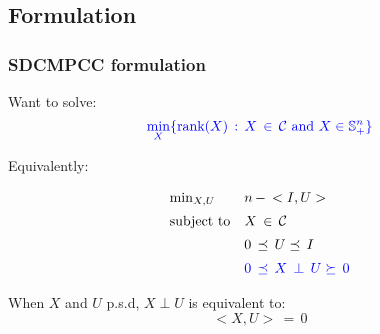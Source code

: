 \documentclass{beamer}
\newcommand{\tblue}{\textcolor{blue}}
\newcommand{\tmag}{\textcolor{magenta}}
\newcommand{\re}{I\!\!\!R}
\begin{document}
%
%
%
%
%
%
%
%
%
%


\subsection*{Formulation}


\begin{frame}
\frametitle{SDCMPCC formulation}

Want to solve:
\begin{displaymath}
\tblue{\min_X \{\mbox{rank} (X) \, : \, X\,\in\,\mathcal{C} ~\mbox{and}~ X \in \mathbb{S}^{n}_+\}}
\end{displaymath}

\bigskip

Equivalently:

\begin{displaymath}
\begin{array}{lll}
\min_{X,U} & n\,-\,<I, U> \\  [5pt]
\mbox{subject to} & X\,\in\,\mathcal{C} \\ [5pt]
& 0 \, \preceq \, U \preceq \, I  \\ [5pt]
& {\tblue{0 \, \preceq \, X \,\perp\, U \succeq \, 0}}
\end{array}
\end{displaymath}

\bigskip
When $X$ and $U$ p.s.d, $X\perp U$ is equivalent to:
\begin{displaymath}
<X, U>\,=\,0
\end{displaymath}
\end{frame}
\end{document}
